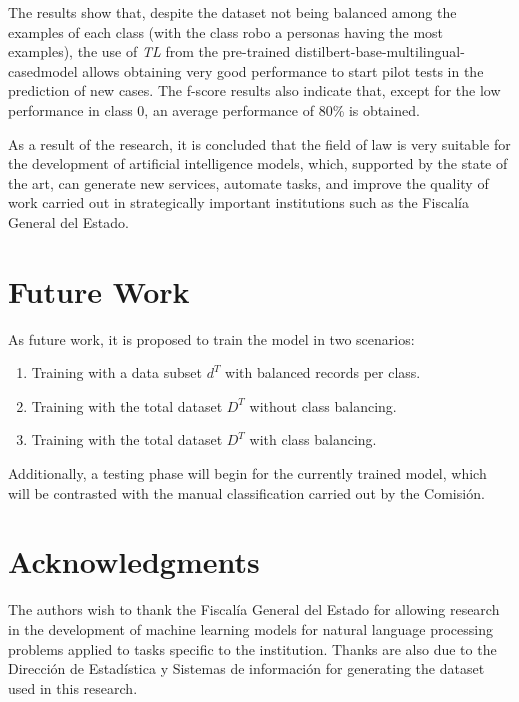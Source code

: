 \documentclass[onecolumn, journal, english, 12pt, a4paper]{IEEEtran} %
\newcommand{\modelohuggingface}{distilbert-base-multilingual-cased}
\theoremstyle{definition}
\begin{document}
The results show that, despite the dataset not being balanced among
the examples of each class (with the class robo a personas having the
most examples), the use of \emph{TL} from the pre-trained
\modelohuggingface model allows obtaining very good performance to
start pilot tests in the prediction of new cases. The f-score results
also indicate that, except for the low performance in class 0, an
average performance of 80\% is obtained.

As a result of the research, it is concluded that the field of law is
very suitable for the development of artificial intelligence models,
which, supported by the state of the art, can generate new services,
automate tasks, and improve the quality of work carried out in
strategically important institutions such as the Fiscalía General del
Estado.

\section{Future Work}\label{chap:futuro}

As future work, it is proposed to train the model in two scenarios:

\begin{enumerate}
\item Training with a data subset $d^T$ with balanced records per
  class.
\item Training with the total dataset $D^T$ without class balancing.
\item Training with the total dataset $D^T$ with class balancing.
\end{enumerate}

Additionally, a testing phase will begin for the currently trained
model, which will be contrasted with the manual classification carried
out by the Comisión.

\section*{Acknowledgments}

The authors wish to thank the Fiscalía General del Estado for allowing
research in the development of machine learning models for natural
language processing problems applied to tasks specific to the
institution. Thanks are also due to the Dirección de Estadística y
Sistemas de información for generating the dataset used in this
research.

\ifCLASSOPTIONcaptionsoff
  \newpage
\fi
\end{document}
